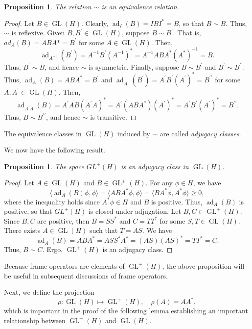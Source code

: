 \documentclass{article}
\newtheorem{prop}[defn]{Proposition}
\newcommand{\ad}{\operatorname{ad}}
\newcommand{\GL}{\operatorname{GL}}
\newcommand{\brak}[1]{\langle #1\rangle}
\begin{document}
\begin{prop}
The relation $\sim$ is an equivalence relation.
\end{prop}
\begin{proof}
Let $B\in\GL(H)$. Clearly, $\ad_I(B)=IBI^*=B$, so that $B\sim B$. Thus, $\sim$ is reflexive. Given $B,B^\prime\in\GL(H)$, suppose $B\sim B^\prime$. That is, $ad_A(B)=ABA*=B^\prime$ for some $A\in\GL(H)$. Then,
\[ \ad_{A^{-1}}(B^\prime)
= A^{-1}B^\prime (A^{-1})^*
= A^{-1}ABA^*(A^*)^{-1}
= B. \]
Thus, $B^\prime\sim B$, and hence $\sim$ is symmetric. Finally, suppose $B\sim B^\prime$ and $B^\prime\sim B^{\prime\prime}$. Thus, $\ad_A(B)=ABA^*=B^\prime$ and $\ad_{A^\prime}(B^\prime)=A^\prime B^\prime (A^\prime)^*=B^{\prime\prime}$ for some $A,A^\prime\in\GL(H)$. Then,
\[ \ad_{A^\prime A}(B)
= A^\prime AB(A^\prime A)^*
= A^\prime (ABA^*)(A^\prime)^*
= A^\prime B^\prime (A^\prime)^*
= B^{\prime\prime}. \]
Thus, $B\sim B^{\prime\prime}$, and hence $\sim$ is transitive. 
\end{proof}

The equivalence classes in $\GL(H)$ induced by $\sim$ are called \emph{adjugacy classes}.

\noindent We now have the following result.

\begin{prop}
The space $GL^+(H)$ is an adjugacy class in $\GL(H)$.
\end{prop}
\begin{proof}
Let $A\in\GL(H)$ and $B\in\GL^+(H)$. For any $\phi\in H$, we have
\[ \brak{\ad_A(B)\phi, \phi}
= \brak{ABA^*\phi, \phi}
= \brak{BA^*\phi, A^*\phi}\geq 0, \]
where the inequality holds since $A^*\phi\in H$ and $B$ is positive. Thus, $\ad_A(B)$ is positive, so that $GL^+(H)$ is closed under adjugation. Let $B,C\in\GL^+(H)$. Since $B,C$ are positive, then $B=SS^*$ and $C=TT^*$ for some $S,T\in\GL(H)$. There exists $A\in\GL(H)$ such that $T=AS$. We have
\[ \ad_A(B) = ABA^*
= ASS^*A^*
= (AS)(AS)^*
= TT^*
= C. \]
Thus, $B\sim C$. Ergo, $\GL^+(H)$ is an adjugacy class.
\end{proof}

\noindent Because frame operators are elements of $\GL^+(H)$, the above proposition will be useful in subsequent discussions of frame operators.

Next, we define the projection 
\begin{equation}
\rho:\GL(H)\mapsto \GL^+(H), \quad
\rho(A)=AA^*,
\end{equation}
which is important in the proof of the following lemma establishing an important relationship between $\GL^+(H)$ and $\GL(H)$.
\end{document}
